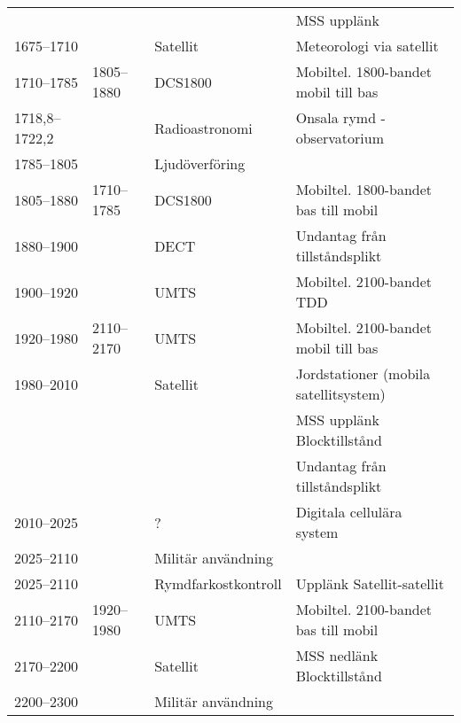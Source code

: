 \begin{landscape}
\begin{landscape}
\begin{longtable}{llll}
	                   &                    &                         & MSS upplänk                           \\
	1675--1710         &                    & Satellit                & Meteorologi via satellit              \\
	1710--1785         & 1805--1880         & DCS1800                 & Mobiltel. 1800-bandet mobil till bas  \\
	1718,8--1722,2     &                    & Radioastronomi          & Onsala rymd - observatorium           \\
	1785--1805         &                    & Ljudöverföring          &                                       \\
	1805--1880         & 1710--1785         & DCS1800                 & Mobiltel. 1800-bandet bas till mobil  \\
	1880--1900         &                    & DECT                    & Undantag från tillståndsplikt         \\
	1900--1920         &                    & UMTS                    & Mobiltel. 2100-bandet TDD             \\
	1920--1980         & 2110--2170         & UMTS                    & Mobiltel. 2100-bandet mobil till bas  \\
	1980--2010         &                    & Satellit                & Jordstationer (mobila satellitsystem) \\
	                   &                    &                         & MSS upplänk Blocktillstånd            \\
	                   &                    &                         & Undantag från tillståndsplikt         \\
	2010--2025         &                    & ?                       & Digitala cellulära system             \\
	2025--2110         &                    & Militär användning      &                                       \\
	2025--2110         &                    & Rymdfarkostkontroll     & Upplänk Satellit-satellit             \\
	2110--2170         & 1920--1980         & UMTS                    & Mobiltel. 2100-bandet bas till mobil  \\
	2170--2200         &                    & Satellit                & MSS nedlänk Blocktillstånd            \\
	2200--2300         &                    & Militär användning      &                                       \\

\end{longtable}
\end{landscape}
\end{landscape}
